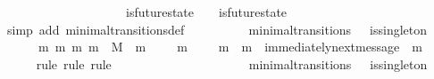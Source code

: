 \begin{isabellebody}
\ \ \ \ \ \ \ \ \ \ \ \ \ \ {\isacharparenleft}{\isasymnexists}\ {\isasymsigma}{\isacharprime}{\isacharprime}{\isachardot}\ {\isasymsigma}{\isacharprime}{\isacharprime}\ {\isasymin}\ {\isasymSigma}\ {\isasymand}\ is{\isacharunderscore}future{\isacharunderscore}state\ {\isacharparenleft}{\isasymsigma}{\isacharcomma}\ {\isasymsigma}{\isacharprime}{\isacharprime}{\isacharparenright}\ {\isasymand}\ is{\isacharunderscore}future{\isacharunderscore}state\ {\isacharparenleft}{\isasymsigma}{\isacharprime}{\isacharprime}{\isacharcomma}\ {\isasymsigma}{\isacharprime}{\isacharparenright}\ {\isasymand}\ {\isasymsigma}\ {\isasymnoteq}\ {\isasymsigma}{\isacharprime}{\isacharprime}\ {\isasymand}\ {\isasymsigma}{\isacharprime}{\isacharprime}\ {\isasymnoteq}\ {\isasymsigma}{\isacharprime}{\isacharparenright}{\isachardoublequoteclose}\isanewline
\ \ \ \ \isamarkupfalse%
\ {\isacharparenleft}simp\ add{\isacharcolon}\ minimal{\isacharunderscore}transitions{\isacharunderscore}def{\isacharparenright}\isanewline
\ \ \isamarkupfalse%
\ {\isachardoublequoteopen}{\isasymforall}\ {\isasymsigma}\ {\isasymsigma}{\isacharprime}{\isachardot}\ {\isacharparenleft}{\isasymsigma}{\isacharcomma}\ {\isasymsigma}{\isacharprime}{\isacharparenright}\ {\isasymin}\ minimal{\isacharunderscore}transitions\ {\isasymand}\ {\isasymnot}\ is{\isacharunderscore}singleton\ {\isacharparenleft}{\isasymsigma}{\isacharprime}{\isacharminus}\ {\isasymsigma}{\isacharparenright}\isanewline
\ \ \ \ {\isasymlongrightarrow}\ {\isacharparenleft}{\isasymexists}\ m{}\ m{}{\isachardot}\ {\isacharbraceleft}m{}{\isacharcomma}\ m{}{\isacharbraceright}\ {\isasymsubseteq}\ M\ {\isasymand}\ m{}\ {\isasymin}\ {\isasymsigma}{\isacharprime}{\isacharminus}\ {\isasymsigma}\ {\isasymand}\ m{}\ {\isasymin}\ {\isasymsigma}{\isacharprime}{\isacharminus}\ {\isasymsigma}\ {\isasymand}\ m{}\ {\isasymnoteq}\ m{}\ {\isasymand}\ immediately{\isacharunderscore}next{\isacharunderscore}message\ {\isacharparenleft}{\isasymsigma}{\isacharcomma}\ m{}{\isacharparenright}{\isacharparenright}{\isachardoublequoteclose}\isanewline
\ \ \ \ \isamarkupfalse%
\ {\isacharparenleft}rule{\isacharcomma}\ rule{\isacharcomma}\ rule{\isacharparenright}\ \isanewline
\ \ \isamarkupfalse%
\ {\isacharminus}\isanewline
\ \ \ \ \isamarkupfalse%
\ {\isasymsigma}\ {\isasymsigma}{\isacharprime}\isanewline
\ \ \ \ \isamarkupfalse%
\ {\isachardoublequoteopen}{\isacharparenleft}{\isasymsigma}{\isacharcomma}\ {\isasymsigma}{\isacharprime}{\isacharparenright}\ {\isasymin}\ minimal{\isacharunderscore}transitions\ {\isasymand}\ {\isasymnot}\ is{\isacharunderscore}singleton\ {\isacharparenleft}{\isasymsigma}{\isacharprime}\ {\isacharminus}\ {\isasymsigma}{\isacharparenright}{\isachardoublequoteclose}\isanewline

\end{isabellebody}

